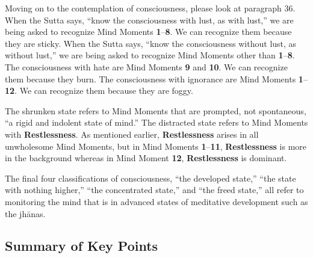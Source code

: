 Moving on to the contemplation of consciousness, please look at paragraph 36. When the Sutta says, “know the consciousness with lust, as with lust,” we are being asked to recognize Mind Moments \textbf{1}--\textbf{8}. We can recognize them because they are sticky. When the Sutta says, “know the consciousness without lust, as without lust,” we are being asked to recognize Mind Moments other than \textbf{1}--\textbf{8}. The consciousness with hate are Mind Moments \textbf{9} and \textbf{10}. We can recognize them because they burn. The consciousness with ignorance are Mind Moments \textbf{1}--\textbf{12}. We can recognize them because they are foggy.

The shrunken state refers to Mind Moments that are prompted, not spontaneous, “a rigid and indolent state of mind.” The distracted state refers to Mind Moments with \textbf{Restlessness}. As mentioned earlier, \textbf{Restlessness} arises in all unwholesome Mind Moments, but in Mind Moments \textbf{1}--\textbf{11}, \textbf{Restlessness} is more in the background whereas in Mind Moment \textbf{12}, \textbf{Restlessness} is dominant.

The final four classifications of consciousness, “the developed state,” “the state with nothing higher,” “the concentrated state,” and “the freed state,” all refer to monitoring the mind that is in advanced states of meditative development such as the jhānas.

\pagebreak

\subsection*{Summary of Key Points}


